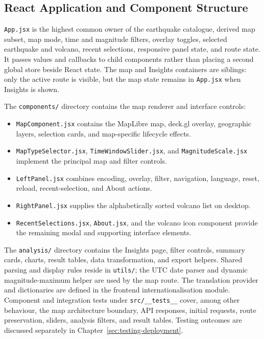 \documentclass[12pt]{article}
\begin{document}
\subsection{React Application and Component Structure}
\label{subsec:frontend_structure}

\texttt{App.jsx} is the highest common owner of the earthquake catalogue, derived map subset, map mode, time and magnitude filters, overlay toggles, selected earthquake and volcano, recent selections, responsive panel state, and route state. It passes values and callbacks to child components rather than placing a second global store beside React state. The map and Insights containers are siblings: only the active route is visible, but the map state remains in \texttt{App.jsx} when Insights is shown.

The \texttt{components/} directory contains the map renderer and interface controls:

\begin{itemize}
    \item \texttt{MapComponent.jsx} contains the MapLibre map, deck.gl overlay, geographic layers, selection cards, and map-specific lifecycle effects.
    \item \texttt{MapTypeSelector.jsx}, \texttt{TimeWindowSlider.jsx}, and \texttt{MagnitudeScale.jsx} implement the principal map and filter controls.
    \item \texttt{LeftPanel.jsx} combines encoding, overlay, filter, navigation, language, reset, reload, recent-selection, and About actions.
    \item \texttt{RightPanel.jsx} supplies the alphabetically sorted volcano list on desktop.
    \item \texttt{RecentSelections.jsx}, \texttt{About.jsx}, and the volcano icon component provide the remaining modal and supporting interface elements.
\end{itemize}

The \texttt{analysis/} directory contains the Insights page, filter controls, summary cards, charts, result tables, data transformation, and export helpers. Shared parsing and display rules reside in \texttt{utils/}; the UTC date parser and dynamic magnitude-maximum helper are used by the map route. The translation provider and dictionaries are defined in the frontend internationalisation module. Component and integration tests under \texttt{src/\_\_tests\_\_} cover, among other behaviour, the map architecture boundary, API responses, initial requests, route preservation, sliders, analysis filters, and result tables. Testing outcomes are discussed separately in Chapter~\ref{sec:testing-deployment}.
\end{document}
